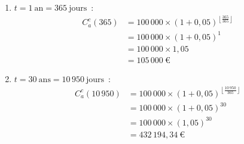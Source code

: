 \documentclass{article}
\begin{document}
\begin{enumerate}[label=\textbf{R2.\arabic*}]
\begin{enumerate}[label=(\alph*)]
                        \item $t = 1\ \text{an} = 365\ \text{jours}$~: 
                        \begin{align*}
                            C_a^c(365) &= 100\,000 \times \left(1 + 0,05\right)^{\left\lfloor \frac{365}{365} \right\rfloor} \\
                            & = 100\,000 \times \left(1 + 0,05 \right)^1                                                \\
                            & = 100\,000 \times 1,05                                                                     \\
                            & = \boxed{105\,000\ \text{€}}                                                             
                        \end{align*}

                        \item $t = 30\ \text{ans} = 10\,950\ \text{jours}$~: 
                        \begin{align*}
                            C_a^c(10\,950) &= 100\,000 \times \left(1 + 0,05\right)^{\left\lfloor \frac{10\,950}{365} \right\rfloor} \\
                            & = 100\,000 \times \left(1 + 0,05 \right)^{30}                                             \\
                            & = 100\,000 \times \left(1,05 \right)^{30}                                             \\
                            & = \boxed{432\,194,34\ \text{€}}                                                                 
                        \end{align*}
                    \end{enumerate}
                    

\end{enumerate}
\end{document}
